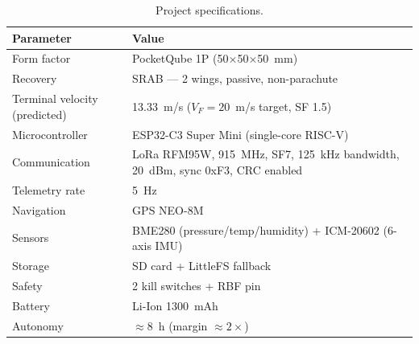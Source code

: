 \begin{table}[htbp]
\centering
{\small
\setlength{\tabcolsep}{6pt}
\begin{tabular}{>{\raggedright}p{5.2cm}l}
\toprule
\textbf{Parameter} & \textbf{Value} \\
\midrule
Form factor & PocketQube 1P (50$\times$50$\times$50~mm) \\
Recovery & SRAB --- 2 wings, passive, non-parachute \\
Terminal velocity (predicted) & 13.33~m/s ($V_F = 20$~m/s target, SF 1.5) \\
Microcontroller & ESP32-C3 Super Mini (single-core RISC-V) \\
Communication & LoRa RFM95W, 915~MHz, SF7, 125~kHz bandwidth, 20~dBm, sync 0xF3, CRC enabled \\
Telemetry rate & 5~Hz \\
Navigation & GPS NEO-8M \\
Sensors & BME280 (pressure/temp/humidity) + ICM-20602 (6-axis IMU) \\
Storage & SD card + LittleFS fallback \\
Safety & 2 kill switches + RBF pin \\
Battery & Li-Ion 1300~mAh \\
Autonomy & $\approx$8~h (margin $\approx 2\times$) \\
\bottomrule
\end{tabular}
\caption{Project specifications.}
\label{tab:specs}

}
\end{table}
